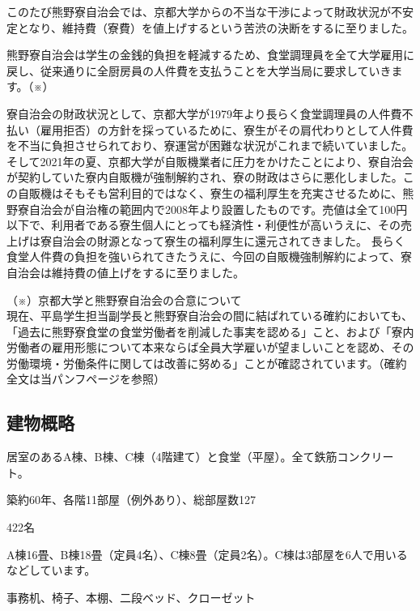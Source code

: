     \begin{tcolorbox}[colback=white, colbacktitle=gray!30!white, coltitle=black, title=2022年4月からの寮費200円値上げについて,breakable]
      \setlength{\parindent}{1zw}
      \small{このたび熊野寮自治会では、京都大学からの不当な干渉によって財政状況が不安定となり、維持費（寮費）を値上げするという苦渋の決断をするに至りました。
      
      熊野寮自治会は学生の金銭的負担を軽減するため、食堂調理員を全て大学雇用に戻し、従来通りに全厨房員の人件費を支払うことを大学当局に要求していきます。（※）
      
      寮自治会の財政状況として、京都大学が1979年より長らく食堂調理員の人件費不払い（雇用拒否）の方針を採っているために、寮生がその肩代わりとして人件費を不当に負担させられており、寮運営が困難な状況がこれまで続いていました。そして2021年の夏、京都大学が自販機業者に圧力をかけたことにより、寮自治会が契約していた寮内自販機が強制解約され、寮の財政はさらに悪化しました。この自販機はそもそも営利目的ではなく、寮生の福利厚生を充実させるために、熊野寮自治会が自治権の範囲内で2008年より設置したものです。売値は全て100円以下で、利用者である寮生個人にとっても経済性・利便性が高いうえに、その売上げは寮自治会の財源となって寮生の福利厚生に還元されてきました。
      長らく食堂人件費の負担を強いられてきたうえに、今回の自販機強制解約によって、寮自治会は維持費の値上げをするに至りました。
      
      \noindent（※）京都大学と熊野寮自治会の合意について\\

      現在、平島学生担当副学長と熊野寮自治会の間に結ばれている確約においても、「過去に熊野寮食堂の食堂労働者を削減した事実を認める」こと、および「寮内労働者の雇用形態について本来ならば全員大学雇いが望ましいことを認め、その労働環境・労働条件に関しては改善に努める」ことが確認されています。（確約全文は当パンフ\pageref{page:確約}ページを参照）}

    \end{tcolorbox}


		\subsection{建物概略}
		\begin{description}
		\item 居室のあるA棟、B棟、C棟（4階建て）と食堂（平屋）。全て鉄筋コンクリート。
		\item 築約60年、各階11部屋（例外あり）、総部屋数127
		\item[定員] 422名
		\item[居室] A棟16畳、B棟18畳（定員4名）、C棟8畳（定員2名）。C棟は3部屋を6人で用いるなどしています。
		\item[備品] 事務机、椅子、本棚、二段ベッド、クローゼット
		\end{description}

